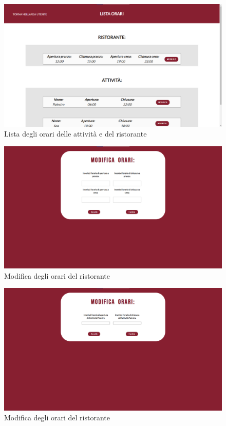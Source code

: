 \documentclass [a4paper, 12pt]{book}
\begin{document}
\begin{figure}[!h]
\centering
\includegraphics[scale=0.22]{ListaOrari.png}
\caption{Lista degli orari delle attività e del ristorante}
\label{ListaOrari}
\end{figure}

\begin{figure}[!h]
\centering
\includegraphics[scale=0.23]{ModificaOrariRistorante.png}
\caption{Modifica degli orari del ristorante}
\label{ModificaOrariRistorante}
\end{figure}\newpage

\begin{figure}[!h]
\centering
\includegraphics[scale=0.3]{ModificaOrariAttivita.png}
\caption{Modifica degli orari del ristorante}
\label{ModificaOrariAttivita}
\end{figure}
\end{document}
